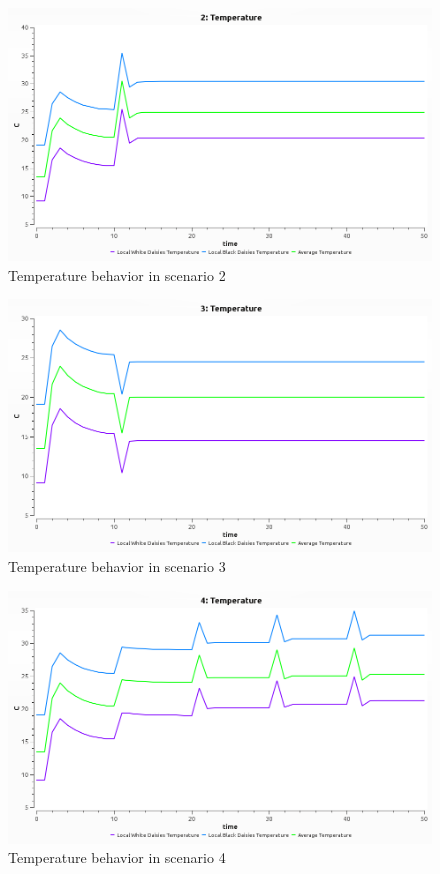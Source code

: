 \documentclass[12pt,a4paper,parskip]{scrartcl}
\begin{document}
\begin{figure}
    \centering
    \includegraphics[width=1\textwidth]{2.png}
    \caption{\label{fig:temp:2}Temperature behavior in scenario 2}
\end{figure}
\begin{figure}
    \centering
    \includegraphics[width=1\textwidth]{3.png}
    \caption{\label{fig:temp:3}Temperature behavior in scenario 3}
\end{figure}
\begin{figure}
    \centering
    \includegraphics[width=1\textwidth]{4.png}
    \caption{\label{fig:temp:4}Temperature behavior in scenario 4}
\end{figure}
\end{document}
